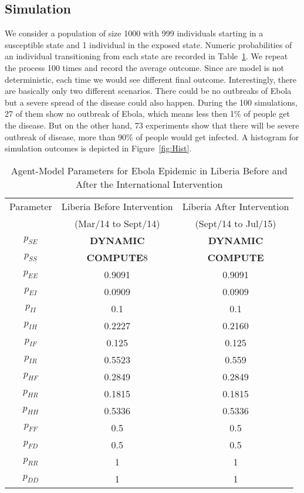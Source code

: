 \subsection{Simulation}
We consider a population of size 1000 with 999 individuals starting in a susceptible state and 1 individual in the exposed state. Numeric probabilities of an individual transitioning from each state are recorded in Table~\ref{tab:probabilities}. We repeat the process 100 times and record the average outcome.  
Since are model is not deterministic, each time we would see different final outcome. Interestingly, there are basically only two different scenarios. There could be no outbreaks of Ebola but a severe spread of the disease could also happen. During the 100 simulations, 27 of them show no outbreak of Ebola, which means less then 1\% of people get the disease. But on the other hand, 73 experiments show that there will be severe outbreak of disease, more than 90\% of people would get infected. A histogram for simulation outcomes is depicted in Figure~\ref{fig:Hist}.
%
%
%
%
%
%
\begin{table}[h!]
\caption{Agent-Model Parameters for Ebola Epidemic in Liberia Before and After the International Intervention} %
\centering %
\begin{tabular}{c c c } 
\hline\hline %
Parameter & Liberia Before Intervention  & Liberia After Intervention \\ [0.5ex] 
 & (Mar/14 to Sept/14) &  (Sept/14 to Jul/15) \\ [0.5ex] %
\hline %
$p_{SE}$ & \textbf{DYNAMIC} & \textbf{DYNAMIC} \\ 
$p_{SS}$ & \textbf{COMPUTE}8 & \textbf{COMPUTE}  \\ 
$p_{EE}$ & 0.9091 & 0.9091  \\ 
$p_{EI}$ & 0.0909 & 0.0909  \\ 
$p_{II}$ & 0.1 & 0.1  \\ 
$p_{IH}$ & 0.2227 & 0.2160  \\ 
$p_{IF}$ & 0.125 & 0.125  \\ 
$p_{IR}$ & 0.5523 & 0.559  \\ 
$p_{HF}$ & 0.2849 & 0.2849 \\ 
$p_{HR}$ & 0.1815 & 0.1815 \\ 
$p_{HH}$ & 0.5336& 0.5336  \\ 
$p_{FF}$ & 0.5 & 0.5 \\ 
$p_{FD}$ & 0.5 & 0.5  \\ 
$p_{RR}$ & 1 & 1  \\ 
$p_{DD}$ & 1 & 1 \\ [1ex] 
\hline 
\end{tabular}
\label{tab:probabilities}
\end{table}

